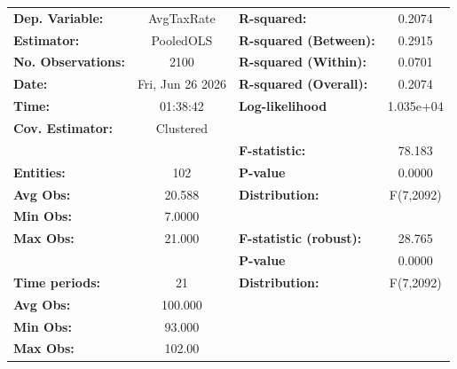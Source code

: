 \begin{center}
\begin{tabular}{lclc}
\toprule
\textbf{Dep. Variable:}                       &     AvgTaxRate     & \textbf{  R-squared:         }   &      0.2074      \\
\textbf{Estimator:}                           &     PooledOLS      & \textbf{  R-squared (Between):}  &      0.2915      \\
\textbf{No. Observations:}                    &        2100        & \textbf{  R-squared (Within):}   &      0.0701      \\
\textbf{Date:}                                &  Fri, Jun 26 2026  & \textbf{  R-squared (Overall):}  &      0.2074      \\
\textbf{Time:}                                &      01:38:42      & \textbf{  Log-likelihood     }   &    1.035e+04     \\
\textbf{Cov. Estimator:}                      &     Clustered      & \textbf{                     }   &                  \\
\textbf{}                                     &                    & \textbf{  F-statistic:       }   &      78.183      \\
\textbf{Entities:}                            &        102         & \textbf{  P-value            }   &      0.0000      \\
\textbf{Avg Obs:}                             &       20.588       & \textbf{  Distribution:      }   &    F(7,2092)     \\
\textbf{Min Obs:}                             &       7.0000       & \textbf{                     }   &                  \\
\textbf{Max Obs:}                             &       21.000       & \textbf{  F-statistic (robust):} &      28.765      \\
\textbf{}                                     &                    & \textbf{  P-value            }   &      0.0000      \\
\textbf{Time periods:}                        &         21         & \textbf{  Distribution:      }   &    F(7,2092)     \\
\textbf{Avg Obs:}                             &      100.000       & \textbf{                     }   &                  \\
\textbf{Min Obs:}                             &       93.000       & \textbf{                     }   &                  \\
\textbf{Max Obs:}                             &       102.00       & \textbf{                     }   &                  \\

\end{tabular}
\end{center}
